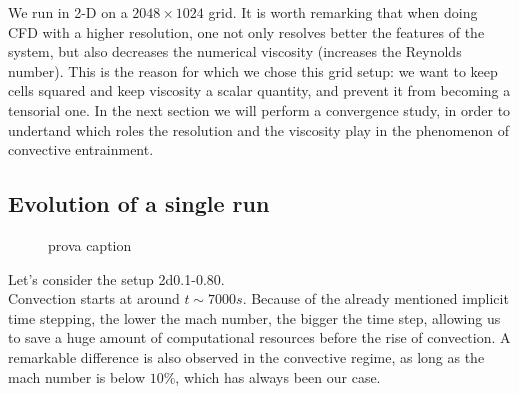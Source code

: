 We run in 2-D on a $2048 \times 1024$ grid. It is worth remarking that when doing CFD with a higher resolution, one not only resolves better the features of the system, but also decreases the numerical viscosity (increases the Reynolds number). This is the reason for which we chose this grid setup: we want to keep cells squared and keep viscosity a scalar quantity, and prevent it from becoming a tensorial one. In the next section we will perform a convergence study, in order to undertand which roles the resolution and the viscosity play in the phenomenon of convective entrainment.\\ 

\subsection{Evolution of a single run}
\begin{figure}[t]
  \centering
      \hfill
	  \label{2d001-LRps2}
	\caption{prova caption}
  \end{figure}
Let's consider the setup 2d0.1-0.80. \\
Convection starts at around $t \sim 7000 s$. Because of the already mentioned implicit time stepping, the lower the mach number, the bigger the time step, allowing us to save a huge amount of computational resources before the rise of convection. A remarkable difference is also observed in the convective regime, as long as the mach number is below $10 \%$, which has always been our case.\\
